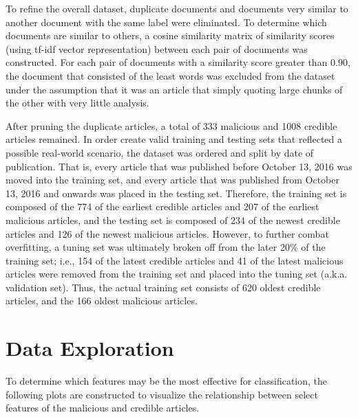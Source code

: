 To refine the overall dataset, duplicate documents and documents very similar to another document with the same label were eliminated.  To determine which documents are similar to others, a cosine similarity matrix of similarity scores (using tf-idf vector representation) between each pair of documents was constructed.  For each pair of documents with a similarity score greater than 0.90, the document that consisted of the least words was excluded from the dataset under the assumption that it was an article that simply quoting large chunks of the other with very little analysis.

After pruning the duplicate articles, a total of 333 malicious and 1008 credible articles remained.  In order create valid training and testing sets that reflected a possible real-world scenario, the dataset was ordered and split by date of publication.  That is, every article that was published before October 13, 2016 was moved into the training set, and every article that was published from October 13, 2016 and onwards was placed in the testing set.  Therefore, the training set is composed of the 774 of the earliest credible articles and 207 of the earliest malicious articles, and the testing set is composed of 234 of the newest credible articles and 126 of the newest malicious articles.  However, to further combat overfitting, a tuning set was ultimately broken off from the later 20\% of the training set; i.e., 154 of the latest credible articles and 41 of the latest malicious articles were removed from the training set and placed into the tuning set (a.k.a. validation set).  Thus, the actual training set consists of 620 oldest credible articles, and the 166 oldest malicious articles.


\section{Data Exploration} \label{dataExploration}

To determine which features may be the most effective for classification, the following plots are constructed to visualize the relationship between select features of the malicious and credible articles.


